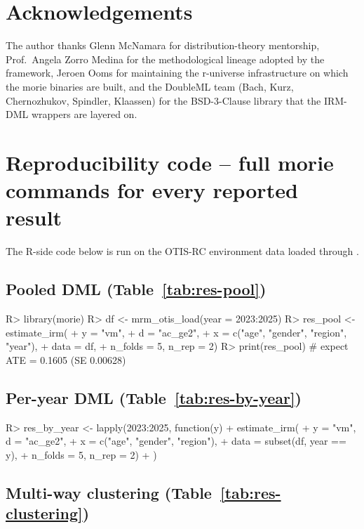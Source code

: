 \documentclass[article,shortnames,nojss]{jss}
\begin{document}
\section*{Acknowledgements}

The author thanks Glenn McNamara for distribution-theory mentorship,
Prof.~Angela Zorro Medina for the methodological lineage adopted by
the framework, Jeroen Ooms for maintaining the r-universe
infrastructure on which the morie binaries are built, and the
DoubleML team (Bach, Kurz, Chernozhukov, Spindler, Klaassen) for
the BSD-3-Clause library that the IRM-DML wrappers are layered on.

\appendix

\section{Reproducibility code -- full morie commands for every reported result}
\label{app:reproducibility}

The R-side code below is run on the OTIS-RC environment data loaded
through .

\subsection[Pooled DML]{Pooled DML (Table~\ref{tab:res-pool})}

\begin{Code}
R> library(morie)
R> df  <- mrm_otis_load(year = 2023:2025)
R> res_pool <- estimate_irm(
+    y    = "vm",
+    d    = "ac_ge2",
+    x    = c("age", "gender", "region", "year"),
+    data = df,
+    n_folds = 5, n_rep = 2)
R> print(res_pool)   # expect ATE = 0.1605 (SE 0.00628)
\end{Code}

\subsection[Per-year DML]{Per-year DML (Table~\ref{tab:res-by-year})}

\begin{Code}
R> res_by_year <- lapply(2023:2025, function(y) {
+    estimate_irm(
+      y    = "vm", d = "ac_ge2",
+      x    = c("age", "gender", "region"),
+      data = subset(df, year == y),
+      n_folds = 5, n_rep = 2)
+  })
\end{Code}

\subsection[Multi-way clustering]{Multi-way clustering (Table~\ref{tab:res-clustering})}
\end{document}
